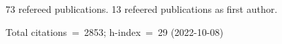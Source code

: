 73 refereed publications. 13 refeered publications as first author.

Total citations~=~2853; h-index~=~29 (2022-10-08)